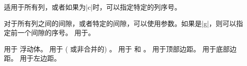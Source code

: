 % 
% 


% 
适用于所有列，或者如果为|c|时，可以指定特定的列序号。

对于所有列之间的间隙，或者特定的间隙，可以使用参数。如果是|g|，则可以指定前一个间隙的序号。
% 
% 
用于\mctext{}。

用于 \pwise{} 浮动体。
% 
用于 (\mgfnote{} 或非合并的) \Scfnote{}。
% 
用于 \Preenv{} 和 \postenv。
% 
用于顶部边距。
% 
用于底部边距。
% 
用于左边距。

